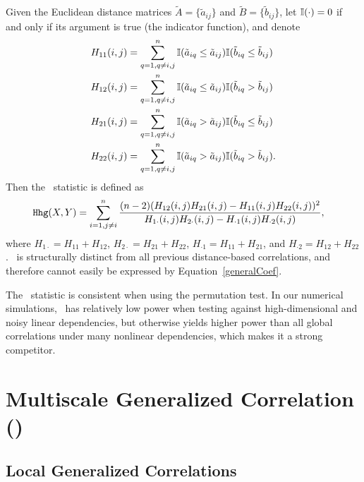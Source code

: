 \documentclass[11pt]{extarticle}
\begin{document}
Given the Euclidean distance matrices $\tilde{A}=\{\tilde{a}_{ij}\}$ and $\tilde{B}=\{\tilde{b}_{ij}\}$, let $\mathbb{I}(\cdot)=0$ if and only if its argument is true (the indicator function), and denote
\begin{align*}
H_{11}(i,j) &= \sum_{q=1,q\neq i,j}^{n}\mathbb{I}(\tilde{a}_{iq} \leq \tilde{a}_{ij})\mathbb{I}(\tilde{b}_{iq} \leq \tilde{b}_{ij}) \\
H_{12}(i,j) &= \sum_{q=1,q\neq i,j}^{n}\mathbb{I}(\tilde{a}_{iq} \leq \tilde{a}_{ij})\mathbb{I}(\tilde{b}_{iq} > \tilde{b}_{ij}) \\
H_{21}(i,j) &= \sum_{q=1,q\neq i,j}^{n}\mathbb{I}(\tilde{a}_{iq} > \tilde{a}_{ij})\mathbb{I}(\tilde{b}_{iq} \leq \tilde{b}_{ij}) \\
H_{22}(i,j) &= \sum_{q=1,q\neq i,j}^{n}\mathbb{I}(\tilde{a}_{iq} > \tilde{a}_{ij})\mathbb{I}(\tilde{b}_{iq} > \tilde{b}_{ij}).
\end{align*}
Then the \Hhg~statistic is defined as
\begin{align*}
{\sc \texttt{Hhg}}(X,Y) &= \sum_{i=1,j\neq i}^{n} \frac{(n-2)(H_{12}(i,j)H_{21}(i,j)-H_{11}(i,j)H_{22}(i,j))^2}{H_{1 \cdot}(i,j)H_{2 \cdot}(i,j)-H_{\cdot 1}(i,j)H_{\cdot 2}(i,j)},
\end{align*}
where $H_{1 \cdot}=H_{11}+H_{12}$, $H_{2 \cdot}=H_{21}+H_{22}$, $H_{\cdot 1}=H_{11}+H_{21}$, and $H_{\cdot 2}=H_{12}+H_{22}$. \Hhg~is structurally distinct from all previous distance-based correlations, and therefore cannot easily be expressed by Equation~\ref{generalCoef}.

The \Hhg~statistic is consistent when using the permutation test. In our numerical simulations, \Hhg~has relatively low power when testing against high-dimensional and noisy linear dependencies, but  otherwise yields higher power than all global correlations under many nonlinear dependencies, which makes it a strong competitor.

\section{Multiscale Generalized Correlation (\Mgc)}
\label{appen:mgc}

\subsection{Local Generalized Correlations}
\label{appen:localCorr}
\end{document}
